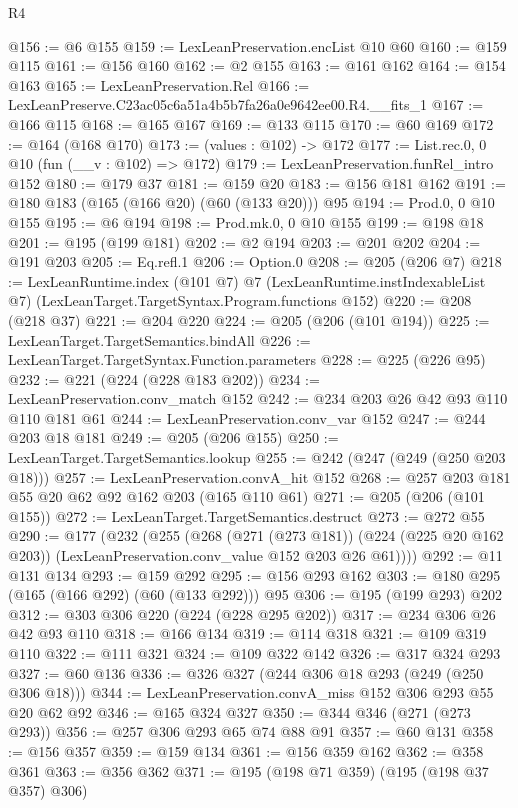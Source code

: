 \begin{lexlean}{R4}
\begin{coremodule}
@156 := @6 @155
@159 := LexLeanPreservation.encList @10 @60
@160 := @159 @115
@161 := @156 @160
@162 := @2 @155
@163 := @161 @162
@164 := @154 @163
@165 := LexLeanPreservation.Rel
@166 := LexLeanPreserve.C23ac05c6a51a4b5b7fa26a0e9642ee00.R4.__fits_1
@167 := @166 @115
@168 := @165 @167
@169 := @133 @115
@170 := @60 @169
@172 := @164 (@168 @170)
@173 := (values : @102) -> @172
@177 := List.rec.{0, 0} @10 (fun (__v : @102) => @172)
@179 := LexLeanPreservation.funRel_intro @152
@180 := @179 @37
@181 := @159 @20
@183 := @156 @181 @162
@191 := @180 @183 (@165 (@166 @20) (@60 (@133 @20))) @95
@194 := Prod.{0, 0} @10 @155
@195 := @6 @194
@198 := Prod.mk.{0, 0} @10 @155
@199 := @198 @18
@201 := @195 (@199 @181)
@202 := @2 @194
@203 := @201 @202
@204 := @191 @203
@205 := Eq.refl.{1}
@206 := Option.{0}
@208 := @205 (@206 @7)
@218 := LexLeanRuntime.index
    (@101 @7)
    @7
    (LexLeanRuntime.instIndexableList @7)
    (LexLeanTarget.TargetSyntax.Program.functions @152)
@220 := @208 (@218 @37)
@221 := @204 @220
@224 := @205 (@206 (@101 @194))
@225 := LexLeanTarget.TargetSemantics.bindAll
@226 := LexLeanTarget.TargetSyntax.Function.parameters
@228 := @225 (@226 @95)
@232 := @221 (@224 (@228 @183 @202))
@234 := LexLeanPreservation.conv_match @152
@242 := @234 @203 @26 @42 @93 @110 @110 @181 @61
@244 := LexLeanPreservation.conv_var @152
@247 := @244 @203 @18 @181
@249 := @205 (@206 @155)
@250 := LexLeanTarget.TargetSemantics.lookup
@255 := @242 (@247 (@249 (@250 @203 @18)))
@257 := LexLeanPreservation.convA_hit @152
@268 := @257 @203 @181 @55 @20 @62 @92 @162 @203 (@165 @110 @61)
@271 := @205 (@206 (@101 @155))
@272 := LexLeanTarget.TargetSemantics.destruct
@273 := @272 @55
@290 := @177
    (@232
      (@255
        (@268
          (@271 (@273 @181))
          (@224 (@225 @20 @162 @203))
          (LexLeanPreservation.conv_value @152 @203 @26 @61))))
@292 := @11 @131 @134
@293 := @159 @292
@295 := @156 @293 @162
@303 := @180 @295 (@165 (@166 @292) (@60 (@133 @292))) @95
@306 := @195 (@199 @293) @202
@312 := @303 @306 @220 (@224 (@228 @295 @202))
@317 := @234 @306 @26 @42 @93 @110
@318 := @166 @134
@319 := @114 @318
@321 := @109 @319 @110
@322 := @111 @321
@324 := @109 @322 @142
@326 := @317 @324 @293
@327 := @60 @136
@336 := @326 @327 (@244 @306 @18 @293 (@249 (@250 @306 @18)))
@344 := LexLeanPreservation.convA_miss @152 @306 @293 @55 @20 @62 @92
@346 := @165 @324 @327
@350 := @344 @346 (@271 (@273 @293))
@356 := @257 @306 @293 @65 @74 @88 @91
@357 := @60 @131
@358 := @156 @357
@359 := @159 @134
@361 := @156 @359 @162
@362 := @358 @361
@363 := @356 @362
@371 := @195 (@198 @71 @359) (@195 (@198 @37 @357) @306)

\end{coremodule}
\end{lexlean}
